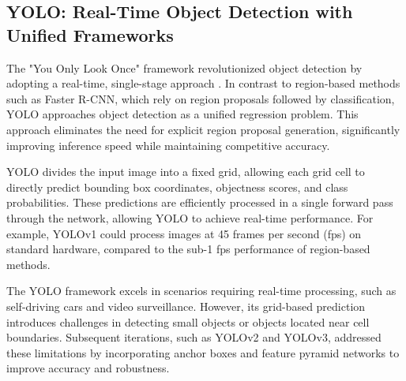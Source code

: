 \documentclass[3p,times]{elsarticle}
\begin{document}
\subsection{YOLO: Real-Time Object Detection with Unified Frameworks}
The "You Only Look Once" framework revolutionized object detection by adopting a real-time, single-stage approach \cite{redmon2016lookonceunifiedrealtime}. In contrast to region-based methods such as Faster R-CNN, which rely on region proposals followed by classification, YOLO approaches object detection as a unified regression problem. This approach eliminates the need for explicit region proposal generation, significantly improving inference speed while maintaining competitive accuracy.

YOLO divides the input image into a fixed grid, allowing each grid cell to directly predict bounding box coordinates, objectness scores, and class probabilities. These predictions are efficiently processed in a single forward pass through the network, allowing YOLO to achieve real-time performance. For example, YOLOv1 could process images at 45 frames per second (fps) on standard hardware, compared to the sub-1 fps performance of region-based methods.

The YOLO framework excels in scenarios requiring real-time processing, such as self-driving cars and video surveillance. However, its grid-based prediction introduces challenges in detecting small objects or objects located near cell boundaries. Subsequent iterations, such as YOLOv2 and YOLOv3, addressed these limitations by incorporating anchor boxes and feature pyramid networks to improve accuracy and robustness.
\end{document}

